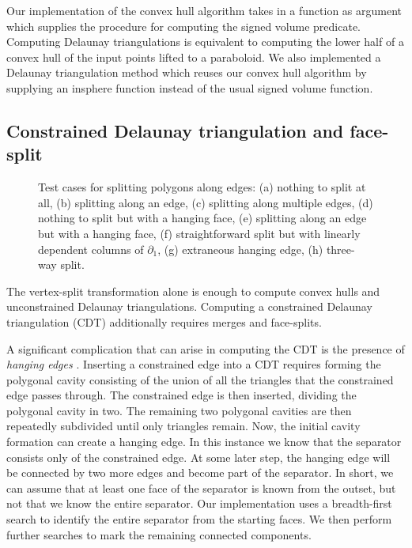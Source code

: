\documentclass[twocolumn]{article}
\begin{document}
Our implementation of the convex hull algorithm takes in a function as argument which supplies the procedure for computing the signed volume predicate.
Computing Delaunay triangulations is equivalent to computing the lower half of a convex hull of the input points lifted to a paraboloid.
We also implemented a Delaunay triangulation method which reuses our convex hull algorithm by supplying an insphere function instead of the usual signed volume function.

\subsection{Constrained Delaunay triangulation and face-split}

\begin{figure}[t]
    \begin{center}
        
    \end{center}
    \caption{Test cases for splitting polygons along edges: (a) nothing to split at all, (b) splitting along an edge, (c) splitting along multiple edges, (d) nothing to split but with a hanging face, (e) splitting along an edge but with a hanging face, (f) straightforward split but with linearly dependent columns of $\partial_1$, (g) extraneous hanging edge, (h) three-way split.}
    \label{fig:face-split-tests}
\end{figure}

The vertex-split transformation alone is enough to compute convex hulls and unconstrained Delaunay triangulations.
Computing a constrained Delaunay triangulation (CDT) additionally requires merges and face-splits.

A significant complication that can arise in computing the CDT is the presence of \emph{hanging edges} \cite{cheng2013delaunay}.
Inserting a constrained edge into a CDT requires forming the polygonal cavity consisting of the union of all the triangles that the constrained edge passes through.
The constrained edge is then inserted, dividing the polygonal cavity in two.
The remaining two polygonal cavities are then repeatedly subdivided until only triangles remain.
Now, the initial cavity formation can create a hanging edge.
In this instance we know that the separator consists only of the constrained edge.
At some later step, the hanging edge will be connected by two more edges and become part of the separator.
In short, we can assume that at least one face of the separator is known from the outset, but not that we know the entire separator.
Our implementation uses a breadth-first search to identify the entire separator from the starting faces.
We then perform further searches to mark the remaining connected components.
\end{document}
